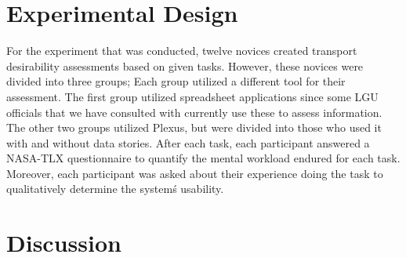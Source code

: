 \documentclass{sigchi}
\begin{document}
\section{Experimental Design}
For the experiment that was conducted, twelve novices created transport desirability assessments based on given tasks. However, these novices were divided into three groups; Each group utilized a different tool for their assessment. The first group utilized spreadsheet applications since some LGU officials that we have consulted with currently use these to assess information. The other two groups utilized Plexus, but were divided into those who used it with and without data stories. After each task, each participant answered a NASA-TLX questionnaire to quantify the mental workload endured for each task. Moreover, each participant was asked about their experience doing the task to qualitatively determine the system\'s usability.  


\section{Discussion}
\end{document}
